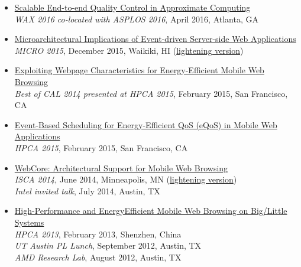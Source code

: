 \documentclass[margin, 9pt]{res} %
\begin{document}
\begin{resume}
\begin{itemize}[leftmargin=*]
	\item \href{https://speakerdeck.com/queeten/end-to-end-quality-control-in-approximate-computing}{Scalable End-to-end Quality Control in Approximate Computing}\\[2pt]
          \textit{WAX 2016 co-located with ASPLOS 2016}, April 2016, Atlanta, GA

	\item \href{https://speakerdeck.com/queeten/microarchitectural-implications-of-event-driven-server-side-web-applications}{Microarchitectural Implications of Event-driven Server-side Web Applications}\\[2pt]
          \textit{MICRO 2015}, December 2015, Waikiki, HI (\href{https://speakerdeck.com/queeten/micro-2015-lightning-session-talk}{lightening version})

	\item \href{https://speakerdeck.com/queeten/exploiting-webpage-characteristics-for-energy-efficient-mobile-web-browsing}{Exploiting Webpage Characteristics for Energy-Efficient Mobile Web Browsing}\\[2pt]
          \textit{Best of CAL 2014 presented at HPCA 2015}, February 2015, San Francisco, CA

	\item \href{https://speakerdeck.com/queeten/event-based-scheduling-for-energy-efficient-quality-of-service-eqos-in-mobile-web-applications}{Event-Based Scheduling for Energy-Efficient QoS (eQoS) in Mobile Web Applications}\\[2pt]
          \textit{HPCA 2015}, February 2015, San Francisco, CA

	\item \href{https://speakerdeck.com/queeten/webcore-architectural-support-for-mobile-web-browsing}{WebCore: Architectural Support for Mobile Web Browsing}\\[2pt]
         \textit{ISCA 2014}, June 2014, Minneapolis, MN (\href{https://speakerdeck.com/queeten/isca-2014-fastforward-session-talk}{lightening version})\\[2pt]
          \textit{Intel invited talk}, July 2014, Austin, TX

	\item \href{https://speakerdeck.com/queeten/little-systems}{High-Performance and EnergyEfficient Mobile Web Browsing on Big/Little Systems}\\[2pt]
          \textit{HPCA 2013}, February 2013, Shenzhen, China\\[2pt]
          \textit{UT Austin PL Lunch}, September 2012, Austin, TX\\[2pt]
          \textit{AMD Research Lab}, August 2012, Austin, TX


\end{itemize}
\end{resume}
\end{document}
